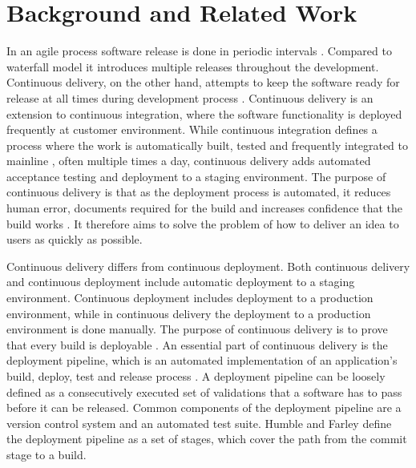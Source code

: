 \documentclass[lnbip]{svmultln}
\begin{document}
\section{Background and Related Work}
In an agile process software release is done in periodic intervals \cite{cockburn2002agile}. Compared to waterfall model it introduces multiple releases throughout the development. Continuous delivery, on the other hand, attempts to keep the software ready for release at all times during development process \cite{cdbook}. Continuous delivery is an extension to continuous integration, where the software functionality is deployed frequently at customer environment. While continuous integration defines a process where the work is automatically built, tested and frequently integrated to mainline \cite{duvall2007continuous}, often multiple times a day, continuous delivery adds automated acceptance testing and deployment to a staging environment. The purpose of continuous delivery is that as the deployment process is automated, it reduces human error, documents required for the build and increases confidence that the build works \cite{cdbook}. It therefore aims to solve the problem of how to deliver an idea to users as quickly as possible.


Continuous delivery differs from continuous deployment. Both continuous delivery and continuous deployment include automatic deployment to a staging environment. Continuous deployment includes deployment to a production environment, while in continuous delivery the deployment to a production environment is done manually. The purpose of continuous delivery is to prove that every build is deployable \cite{cdbook}. An essential part of continuous delivery is the deployment pipeline, which is an automated implementation of an application’s build, deploy, test and release process \cite{humble2006deployment}. A deployment pipeline can be loosely defined as a consecutively executed set of validations that a software has to pass before it can be released. Common components of the deployment pipeline are a version control system and an automated test suite. Humble and Farley define the deployment pipeline as a set of stages, which cover the path from the commit stage to a build.
\end{document}
